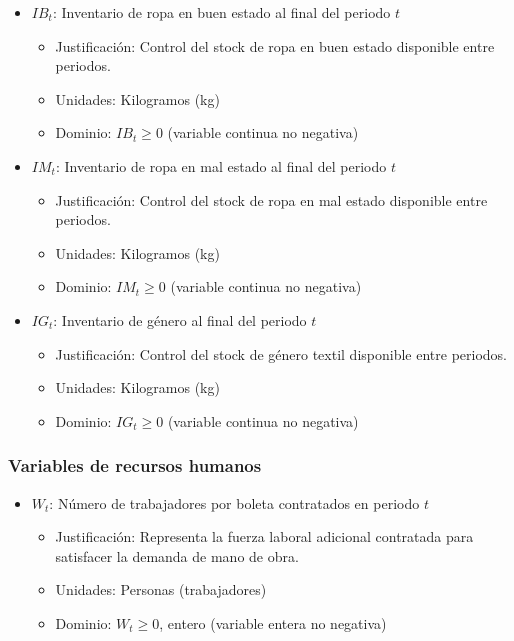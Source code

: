\begin{itemize}
    \item $IB_{t}$: Inventario de ropa en buen estado al final del periodo $t$
    \begin{itemize}
        \item Justificación: Control del stock de ropa en buen estado disponible entre periodos.
        \item Unidades: Kilogramos (kg)
        \item Dominio: $IB_t \geq 0$ (variable continua no negativa)
    \end{itemize}

    \item $IM_{t}$: Inventario de ropa en mal estado al final del periodo $t$
    \begin{itemize}
        \item Justificación: Control del stock de ropa en mal estado disponible entre periodos.
        \item Unidades: Kilogramos (kg)
        \item Dominio: $IM_t \geq 0$ (variable continua no negativa)
    \end{itemize}

    \item $IG_{t}$: Inventario de género al final del periodo $t$
    \begin{itemize}
        \item Justificación: Control del stock de género textil disponible entre periodos.
        \item Unidades: Kilogramos (kg)
        \item Dominio: $IG_t \geq 0$ (variable continua no negativa)
    \end{itemize}
\end{itemize}

\subsubsection*{Variables de recursos humanos}

\begin{itemize}
    \item $W_{t}$: Número de trabajadores por boleta contratados en periodo $t$
    \begin{itemize}
        \item Justificación: Representa la fuerza laboral adicional contratada para satisfacer la demanda de mano de obra.
        \item Unidades: Personas (trabajadores)
        \item Dominio: $W_t \geq 0$, entero (variable entera no negativa)
    \end{itemize}
\end{itemize}

